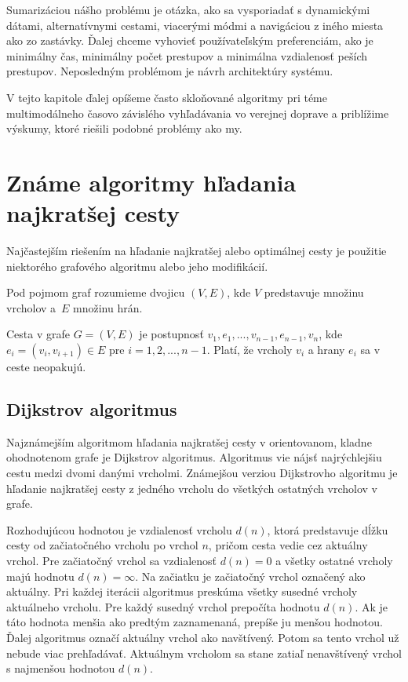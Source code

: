 Sumarizáciou nášho problému je otázka, ako sa vysporiadať s dynamickými dátami, alternatívnymi cestami, viacerými módmi a navigáciou z iného miesta ako zo zastávky. Ďalej chceme vyhovieť používateľským preferenciám, ako je minimálny čas, minimálny počet prestupov a minimálna vzdialenosť peších prestupov. Neposledným problémom je návrh architektúry systému.

V tejto kapitole ďalej opíšeme často skloňované algoritmy pri téme multimodálneho časovo závislého vyhľadávania vo verejnej doprave a priblížime výskumy, ktoré riešili podobné problémy ako my.

\section{Známe algoritmy hľadania najkratšej cesty}
\label{sec:known-algorithms}

Najčastejším riešením na hľadanie najkratšej alebo optimálnej cesty je použitie niektorého grafového algoritmu alebo jeho modifikácií. 

Pod pojmom graf rozumieme dvojicu $(V, E)$, kde $V$ predstavuje množinu vrcholov a~$E$ množinu hrán. 

Cesta v grafe $G = (V, E)$ je postupnosť $v_1, e_1, ..., v_{n-1}, e_{n-1}, v_n$, kde $ e_i = (v_i, v_{i+1}) \in E$ pre $ i = 1, 2,..., n-1$. Platí, že vrcholy $v_i$ a hrany $e_i$ sa v ceste neopakujú.

\subsection{Dijkstrov algoritmus}
\label{sec:dijkstra}
Najznámejším algoritmom hľadania najkratšej cesty v orientovanom, kladne ohodnotenom grafe je Dijkstrov algoritmus. Algoritmus vie nájsť najrýchlejšiu cestu medzi dvomi danými vrcholmi. Známejšou verziou Dijkstrovho algoritmu je hľadanie najkratšej cesty z jedného vrcholu do všetkých ostatných vrcholov v grafe. 

Rozhodujúcou hodnotou je vzdialenosť vrcholu $d(n)$, ktorá predstavuje dĺžku cesty od začiatočného vrcholu po vrchol $n$, pričom cesta vedie cez aktuálny vrchol.
Pre začiatočný vrchol sa vzdialenosť $d(n) = 0$ a všetky ostatné vrcholy majú hodnotu $d(n) = \infty$. Na začiatku je začiatočný vrchol označený ako aktuálny. Pri každej iterácii algoritmus preskúma všetky susedné vrcholy aktuálneho vrcholu. Pre každý susedný vrchol prepočíta hodnotu $d(n)$. Ak je táto hodnota menšia ako predtým zaznamenaná, prepíše ju menšou hodnotou. Ďalej algoritmus označí aktuálny vrchol ako navštívený. Potom sa tento vrchol už nebude viac prehľadávať. Aktuálnym vrcholom sa stane zatiaľ nenavštívený vrchol s najmenšou hodnotou $d(n)$. 


